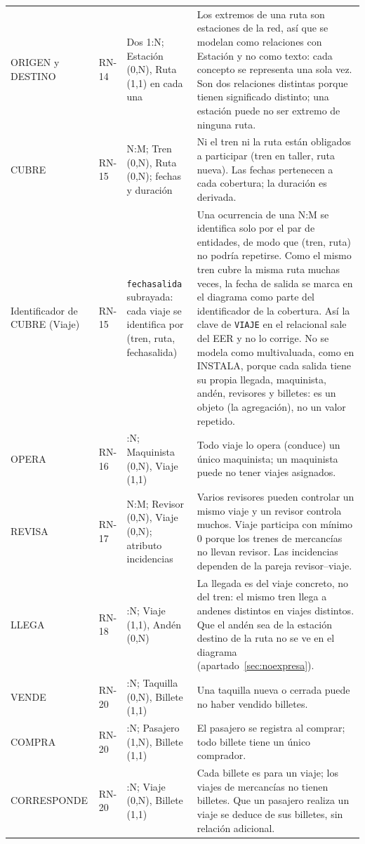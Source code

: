 \documentclass[11pt,a4paper]{article}
\DeclareRobustCommand{\_}{\textunderscore\allowbreak}
\newcommand{\tb}[1]{\texttt{#1}}
\begin{document}
{\begin{longtable}{>{\raggedright\arraybackslash}p{2.9cm} >{\raggedright\arraybackslash}p{1.1cm} >{\raggedright\arraybackslash}p{3.3cm} >{\raggedright\arraybackslash}p{6.6cm}}
ORIGEN y DESTINO & RN-14 & Dos 1:N; Estación (0,N), Ruta (1,1) en cada una & Los extremos de una ruta son estaciones de la red, así que se modelan como relaciones con Estación y no como texto: cada concepto se representa una sola vez. Son dos relaciones distintas porque tienen significado distinto; una estación puede no ser extremo de ninguna ruta. \\
CUBRE & RN-15 & N:M; Tren (0,N), Ruta (0,N); fechas y duración & Ni el tren ni la ruta están obligados a participar (tren en taller, ruta nueva). Las fechas pertenecen a cada cobertura; la duración es derivada. \\
Identificador de CUBRE (Viaje) & RN-15 & \tb{fecha\_salida} subrayada: cada viaje se identifica por (tren, ruta, fecha\_salida) & Una ocurrencia de una N:M se identifica solo por el par de entidades, de modo que (tren, ruta) no podría repetirse. Como el mismo tren cubre la misma ruta muchas veces, la fecha de salida se marca en el diagrama como parte del identificador de la cobertura. Así la clave de \tb{VIAJE} en el relacional sale del EER y no lo corrige. No se modela como multivaluada, como en INSTALA, porque cada salida tiene su propia llegada, maquinista, andén, revisores y billetes: es un objeto (la agregación), no un valor repetido. \\
OPERA & RN-16 & 1:N; Maquinista (0,N), Viaje (1,1) & Todo viaje lo opera (conduce) un único maquinista; un maquinista puede no tener viajes asignados. \\
REVISA & RN-17 & N:M; Revisor (0,N), Viaje (0,N); atributo incidencias & Varios revisores pueden controlar un mismo viaje y un revisor controla muchos. Viaje participa con mínimo 0 porque los trenes de mercancías no llevan revisor. Las incidencias dependen de la pareja revisor–viaje. \\
LLEGA & RN-18 & 1:N; Viaje (1,1), Andén (0,N) & La llegada es del viaje concreto, no del tren: el mismo tren llega a andenes distintos en viajes distintos. Que el andén sea de la estación destino de la ruta no se ve en el diagrama (apartado~\ref{sec:noexpresa}). \\
VENDE & RN-20 & 1:N; Taquilla (0,N), Billete (1,1) & Una taquilla nueva o cerrada puede no haber vendido billetes. \\
COMPRA & RN-20 & 1:N; Pasajero (1,N), Billete (1,1) & El pasajero se registra al comprar; todo billete tiene un único comprador. \\
CORRESPONDE & RN-20 & 1:N; Viaje (0,N), Billete (1,1) & Cada billete es para un viaje; los viajes de mercancías no tienen billetes. Que un pasajero realiza un viaje se deduce de sus billetes, sin relación adicional. \\

\end{longtable}}
\end{document}
